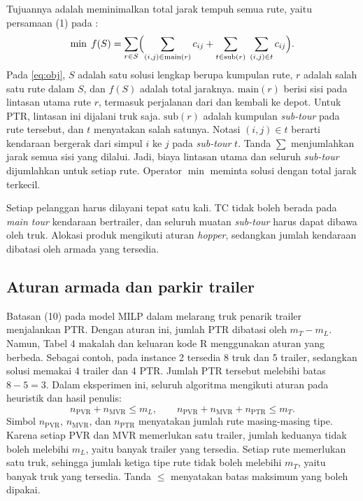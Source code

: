 \documentclass[conference]{IEEEtran}
\begin{document}
Tujuannya adalah meminimalkan total jarak tempuh semua rute, yaitu persamaan (1) pada \cite{davila2023}:
\begin{equation}
\min \; f(S) = \sum_{r\in S}\Bigl(\sum_{(i,j)\in \text{main}(r)} c_{ij} + \sum_{t\in \text{sub}(r)}\;\sum_{(i,j)\in t} c_{ij}\Bigr).\label{eq:obj}
\end{equation}
Pada \eqref{eq:obj}, $S$ adalah satu solusi lengkap berupa kumpulan rute, $r$ adalah salah satu rute dalam $S$, dan $f(S)$ adalah total jaraknya. $\text{main}(r)$ berisi sisi pada lintasan utama rute $r$, termasuk perjalanan dari dan kembali ke depot. Untuk PTR, lintasan ini dijalani truk saja. $\text{sub}(r)$ adalah kumpulan \textit{sub-tour} pada rute tersebut, dan $t$ menyatakan salah satunya. Notasi $(i,j)\in t$ berarti kendaraan bergerak dari simpul $i$ ke $j$ pada \textit{sub-tour} $t$. Tanda $\sum$ menjumlahkan jarak semua sisi yang dilalui. Jadi, biaya lintasan utama dan seluruh \textit{sub-tour} dijumlahkan untuk setiap rute. Operator $\min$ meminta solusi dengan total jarak terkecil.

Setiap pelanggan harus dilayani tepat satu kali. TC tidak boleh berada pada \textit{main tour} kendaraan bertrailer, dan seluruh muatan \textit{sub-tour} harus dapat dibawa oleh truk. Alokasi produk mengikuti aturan \textit{hopper}, sedangkan jumlah kendaraan dibatasi oleh armada yang tersedia.

\subsection{Aturan armada dan parkir trailer}\label{sec:armada}

Batasan (10) pada model MILP dalam \cite{davila2023} melarang truk penarik trailer menjalankan PTR. Dengan aturan ini, jumlah PTR dibatasi oleh $m_T-m_L$. Namun, Tabel 4 makalah dan keluaran kode R menggunakan aturan yang berbeda. Sebagai contoh, pada instance 2 tersedia 8 truk dan 5 trailer, sedangkan solusi memakai 4 trailer dan 4 PTR. Jumlah PTR tersebut melebihi batas $8-5=3$. Dalam eksperimen ini, seluruh algoritma mengikuti aturan pada heuristik dan hasil penulis:
\begin{equation}
n_{\text{PVR}}+n_{\text{MVR}}\le m_L, \qquad n_{\text{PVR}}+n_{\text{MVR}}+n_{\text{PTR}}\le m_T.\label{eq:fleet}
\end{equation}
Simbol $n_{\text{PVR}}$, $n_{\text{MVR}}$, dan $n_{\text{PTR}}$ menyatakan jumlah rute masing-masing tipe. Karena setiap PVR dan MVR memerlukan satu trailer, jumlah keduanya tidak boleh melebihi $m_L$, yaitu banyak trailer yang tersedia. Setiap rute memerlukan satu truk, sehingga jumlah ketiga tipe rute tidak boleh melebihi $m_T$, yaitu banyak truk yang tersedia. Tanda $\le$ menyatakan batas maksimum yang boleh dipakai.
\end{document}
